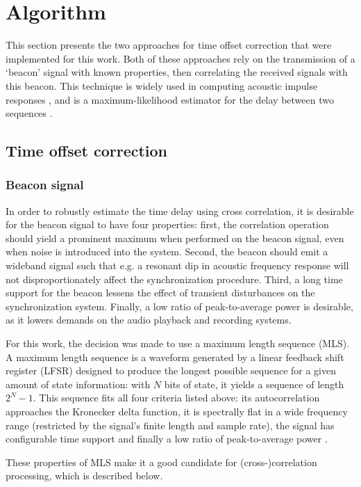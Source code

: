 \documentclass[a4paper, notitlepage]{report}
\begin{document}
\section{Algorithm}
\label{sec:algorithm}
This section presents the two approaches for time offset correction that were implemented for this work. Both of these approaches rely on the transmission of a `beacon' signal with known properties, then correlating the received signals with this beacon. This technique is widely used in computing acoustic impulse responses \cite{Chu1990, MacWilliams1976}, and is a maximum-likelihood estimator for the delay between two sequences \cite{Knapp1976}.

\subsection{Time offset correction}
\subsubsection{Beacon signal}
\label{sec:mls}
In order to robustly estimate the time delay using cross correlation, it is desirable for the beacon signal to have four properties: first, the correlation operation should yield a prominent maximum when performed on the beacon signal, even when noise is introduced into the system. Second, the beacon should emit a wideband signal such that e.g. a resonant dip in acoustic frequency response will not disproportionately affect the synchronization procedure. Third, a long time support for the beacon lessens the effect of transient disturbances on the synchronization system. Finally, a low ratio of peak-to-average power is desirable, as it lowers demands on the audio playback and recording systems.

For this work, the decision was made to use a maximum length sequence (MLS). A maximum length sequence is a waveform generated by a linear feedback shift register (LFSR) designed to produce the longest possible sequence for a given amount of state information: with $N$ bits of state, it yields a sequence of length $2^N-1$. This sequence fits all four criteria listed above: its autocorrelation approaches the Kronecker delta function, it is spectrally flat in a wide frequency range (restricted by the signal's finite length and sample rate), the signal has configurable time support and finally a low ratio of peak-to-average power \cite{MacWilliams1976}. 

These properties of MLS make it a good candidate for (cross-)correlation processing, which is described below.
\end{document}
